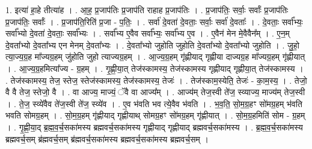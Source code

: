 \documentclass[17pt]{extarticle}
\begin{document}
1. इत्या॑ हा॒हे तीत्या॑ह । . आ॒ह॒ प्र॒जाप॑तिः प्र॒जाप॑ति राहाह प्र॒जाप॑तिः । . प्र॒जाप॑तिः॒ सर्वाः॒ सर्वाः᳚ प्र॒जाप॑तिः प्र॒जाप॑तिः॒ सर्वाः᳚ । . प्र॒जाप॑ति॒रिति॑ प्र॒जा - प॒तिः॒ । . सर्वा॑ दे॒वता॑ दे॒वताः॒ सर्वाः॒ सर्वा॑ दे॒वताः᳚ । . दे॒वताः॒ सर्वा᳚भ्यः॒ सर्वा᳚भ्यो दे॒वता॑ दे॒वताः॒ सर्वा᳚भ्यः । . सर्वा᳚भ्य ए॒वैव सर्वा᳚भ्यः॒ सर्वा᳚भ्य ए॒व । . ए॒वैन॑ मेन मे॒वैवैन᳚म् । . ए॒न॒म् दे॒वता᳚भ्यो दे॒वता᳚भ्य एन मेनम् दे॒वता᳚भ्यः । . दे॒वता᳚भ्यो जुहोति जुहोति दे॒वता᳚भ्यो दे॒वता᳚भ्यो जुहोति । . जु॒हो॒ त्या॒ज्य॒ग्र॒ह मा᳚ज्यग्र॒हम् जु॑होति जुहो त्याज्यग्र॒हम् । . आ॒ज्य॒ग्र॒हम् गृ॑ह्णीयाद् गृह्णीया दाज्यग्र॒ह मा᳚ज्यग्र॒हम् गृ॑ह्णीयात् । . आ॒ज्य॒ग्र॒हमित्या᳚ज्य - ग्र॒हम् । . गृ॒ह्णी॒या॒त् तेज॑स्कामस्य॒ तेज॑स्कामस्य गृह्णीयाद् गृह्णीया॒त् तेज॑स्कामस्य । . तेज॑स्कामस्य॒ तेज॒ स्तेज॒ स्तेज॑स्कामस्य॒ तेज॑स्कामस्य॒ तेजः॑ । . तेज॑स्काम॒स्येति॒ तेजः॑ - का॒म॒स्य॒ । . तेजो॒ वै वै तेज॒ स्तेजो॒ वै । . वा आज्य॒ माज्यं॒ ॅवै वा आज्य᳚म् । . आज्य॑म् तेज॒स्वी ते॑ज॒ स्व्याज्य॒ माज्य॑म् तेज॒स्वी । . ते॒ज॒ स्व्ये॑वैव ते॑ज॒स्वी ते॑ज॒ स्व्ये॑व । . ए॒व भ॑वति भव त्ये॒वैव भ॑वति । . भ॒व॒ति॒ सो॒म॒ग्र॒हꣳ सो॑मग्र॒हम् भ॑वति भवति सोमग्र॒हम् । . सो॒म॒ग्र॒हम् गृ॑ह्णीयाद् गृह्णीयाथ् सोमग्र॒हꣳ सो॑मग्र॒हम् गृ॑ह्णीयात् । . सो॒म॒ग्र॒हमिति॑ सोम - ग्र॒हम् । . गृ॒ह्णी॒या॒द् ब्र॒ह्म॒व॒र्च॒सका॑मस्य ब्रह्मवर्च॒सका॑मस्य गृह्णीयाद् गृह्णीयाद् ब्रह्मवर्च॒सका॑मस्य । . ब्र॒ह्म॒व॒र्च॒सका॑मस्य ब्रह्मवर्च॒सम् ब्र॑ह्मवर्च॒सम् ब्र॑ह्मवर्च॒सका॑मस्य ब्रह्मवर्च॒सका॑मस्य ब्रह्मवर्च॒सम् । \newline
\end{document}
